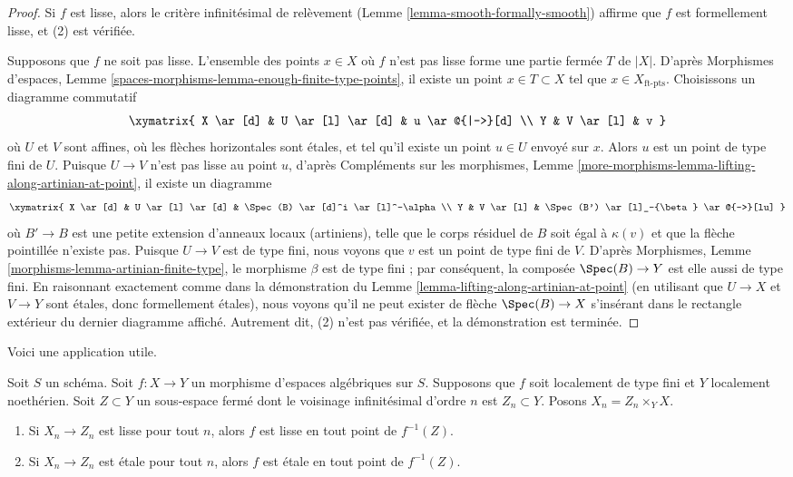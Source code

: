 \begin{proof}
Si $f$ est lisse, alors le critère infinitésimal de relèvement
(Lemme \ref{lemma-smooth-formally-smooth}) affirme que
$f$ est formellement lisse, et (2) est vérifiée.

\medskip\noindent
Supposons que $f$ ne soit pas lisse. L'ensemble des points $x \in X$ où $f$ n'est pas lisse
forme une partie fermée $T$ de $|X|$. D'après
Morphismes d'espaces, Lemme 
\ref{spaces-morphisms-lemma-enough-finite-type-points}, il existe
un point $x \in T \subset X$ tel que $x \in X_{\text{ft-pts}}$. Choisissons un
diagramme commutatif
$$
\xymatrix{
X \ar[d] & U \ar[l] \ar[d] & u \ar@{|->}[d] \\
Y & V \ar[l] & v
}
$$
où $U$ et $V$ sont affines, où les flèches horizontales sont étales, et
tel qu'il existe un point $u \in U$ envoyé sur $x$. Alors $u$
est un point de type fini de $U$. Puisque $U \to V$ n'est pas lisse au
point $u$, d'après
Compléments sur les morphismes,
Lemme \ref{more-morphisms-lemma-lifting-along-artinian-at-point},
il existe un diagramme
$$
\xymatrix{
X \ar[d] & U \ar[l] \ar[d] & \Spec(B) \ar[d]^i \ar[l]^-\alpha  \\
Y & V \ar[l] & \Spec(B') \ar[l]_-{\beta} \ar@{-->}[lu]
}
$$
où $B' \to B$ est une petite extension d'anneaux locaux (artiniens),
telle que le corps résiduel de $B$ soit égal à $\kappa(v)$ et
que la flèche pointillée n'existe pas. Puisque $U \to V$ est
de type fini, nous voyons que $v$ est un point de type fini de $V$. D'après
Morphismes, Lemme \ref{morphisms-lemma-artinian-finite-type},
le morphisme $\beta$ est de type fini ; par conséquent, la composée
$\Spec(B) \to Y$ est elle aussi de type fini.
En raisonnant exactement comme dans la démonstration du
Lemme \ref{lemma-lifting-along-artinian-at-point}
(en utilisant que $U \to X$ et $V \to Y$ sont étales, donc
formellement étales),
nous voyons qu'il ne peut exister de flèche $\Spec(B) \to X$
s'insérant dans le rectangle extérieur du dernier diagramme affiché.
Autrement dit, (2) n'est pas vérifiée, et la démonstration est terminée.
\end{proof}

\noindent
Voici une application utile.

\begin{lemma}
\label{lemma-check-smoothness-on-infinitesimal-nbhds}
Soit $S$ un schéma. Soit $f : X \to Y$ un morphisme
d'espaces algébriques sur $S$. Supposons que $f$ soit
localement de type fini et $Y$ localement noethérien.
Soit $Z \subset Y$ un sous-espace fermé dont le voisinage infinitésimal d'ordre $n$ est
$Z_n \subset Y$. Posons $X_n = Z_n \times_Y X$.
\begin{enumerate}
\item Si $X_n \to Z_n$ est lisse pour tout $n$, alors $f$
est lisse en tout point de $f^{-1}(Z)$.
\item Si $X_n \to Z_n$ est étale pour tout $n$, alors $f$
est étale en tout point de $f^{-1}(Z)$.
\end{enumerate}
\end{lemma}

